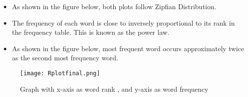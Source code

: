 \begin{itemize}
\item As shown in the figure below, both plots follow Zipfian Distribution\cite{Zipf}.
\item The frequency of each word is close to inversely proportional to its rank in the frequency table. This is known as the power law.
\item As shown in the figure below, most frequent word occurs approximately twice as the second most frequency word.
\end{itemize}	        
\begin{figure}[ht]
	\begin{center}
		\texttt{[image: Rplotfinal.png]}
		\caption{Graph with x-axis as word rank , and y-axis as word frequency}
		\end{center}
\end{figure}